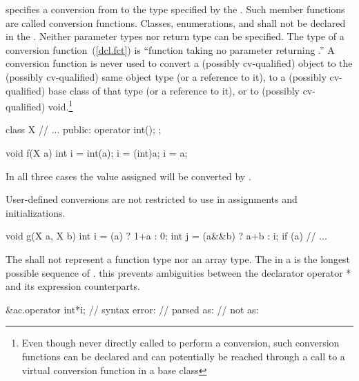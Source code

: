 specifies a conversion from
to the type specified by the
.
Such member functions are called conversion functions.
Classes, enumerations, and  shall not be
declared in the .
Neither parameter types nor return type can be specified.
%
The type of a conversion function~(\ref{dcl.fct}) is
``function taking no parameter returning
.''
A conversion function is never used to convert a (possibly cv-qualified) object
to the (possibly cv-qualified) same object type (or a reference to it),
to a (possibly cv-qualified) base class of that type (or a reference to it),
or to (possibly cv-qualified) void.\footnote{Even though never directly called
to perform a conversion, such conversion functions can be declared and can
potentially be reached through a call to a virtual conversion function in a
base class}

\pnum
\enterexample

\begin{codeblock}
class X {
    // ...
public:
    operator int();
};

void f(X a)
{
    int i = int(a);
    i = (int)a;
    i = a;
}
\end{codeblock}

In all three cases the value assigned will be converted by
.
\exitexampleb

\pnum
User-defined conversions are not restricted to use in assignments and initializations.
\enterexample

\begin{codeblock}
void g(X a, X b)
{
    int i = (a) ? 1+a : 0;
    int j = (a&&b) ? a+b : i;
    if (a) {			// ...
    }
}
\end{codeblock}
\exitexampleb

\pnum
The
shall not represent a function type nor an array type.
The
in a
is the longest possible sequence of
.
\enternote
this prevents ambiguities between the declarator operator * and its expression
counterparts.
\enterexample

\begin{codeblock}
&ac.operator int*i;		// syntax error:
				// parsed as: 
				// not as: 
\end{codeblock}

